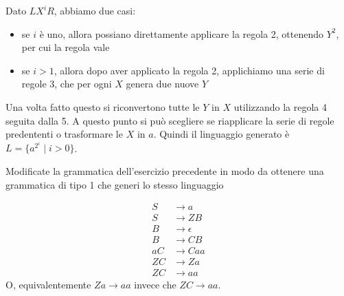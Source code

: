 \documentclass[12pt, answers]{exam}
\newcommand{\der}{\Rightarrow}
\newcommand{\prd}{\rightarrow}
\begin{document}
\begin{questions}
\begin{solution}
		Dato $LX^i R$, abbiamo due casi:
		\begin{itemize}
			\item se $i$ è uno, allora possiano direttamente applicare la regola 2, ottenendo $Y^2$, per cui la regola vale
			\item se $i > 1$, allora dopo aver applicato la regola 2, applichiamo una serie di regole 3, che per ogni $X$ genera due nuove $Y$
		\end{itemize}
		Una volta fatto questo si riconvertono tutte le $Y$ in $X$ utilizzando la regola 4 seguita dalla 5.
		A questo punto si può scegliere se riapplicare la serie di regole predententi o trasformare le $X$ in $a$.
		Quindi il linguaggio generato è $L = \{ a^{2^i} \mid i > 0 \}$.
		\end{solution}
		\question Modificate la grammatica dell'esercizio precedente in modo da ottenere una grammatica di tipo 1 che generi lo stesso linguaggio
		\begin{solution}

		\begin{align}
			S &\prd a \\
			S &\prd Z B \\
			B &\prd \epsilon \\
			B &\prd C B \\
			a C &\prd C a a \\
			Z C &\prd Z a \\
			Z C &\prd a a
		\end{align}
		O, equivalentemente $Z a \prd a a$ invece che $Z C \prd a a$.


\end{solution}
\end{questions}
\end{document}

